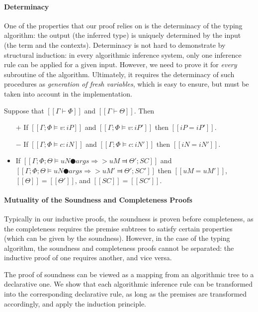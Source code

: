 \paragraph*{Determinacy}
    One of the properties that our proof relies on is the determinacy of the 
    typing algorithm: the output (the inferred type)
    is uniquely determined by the input (the term and the contexts).
    Determinacy is not hard to demonstrate by structural induction: 
    in every algorithmic inference system, only one inference rule can be applied 
    for a given input.  However, we need to prove it for \emph{every} 
    subroutine of the algorithm. Ultimately, it requires 
    the determinacy of such procedures as \emph{generation of fresh variables}, 
    which is easy to ensure, but must be taken into account in the implementation.

\begin{lemma*}
    Suppose that $[[Γ ⊢ Φ]]$ and $[[Γ ⊢ Θ]]$. Then 
    \begin{itemize}
        \item [$+$] If $[[Γ; Φ ⊨ v : iP]]$ and $[[Γ; Φ ⊨ v : iP']]$ then $[[iP = iP']]$.
        \item [$-$] If $[[Γ; Φ ⊨ c : iN]]$ and $[[Γ; Φ ⊨ c : iN']]$ then $[[iN = iN']]$.
        \item If $[[Γ; Φ; Θ ⊨ uN ● args ⇒> uM ⫤ Θ'; SC]]$ and 
            $[[Γ; Φ; Θ ⊨ uN ● args ⇒> uM' ⫤ Θ'; SC']]$ then 
            $[[uM = uM']]$, $[[Θ]] = [[Θ']]$, and $[[SC]] =[[SC']]$.  
    \end{itemize}
\end{lemma*}

\paragraph*{Mutuality of the Soundness and Completeness Proofs}

Typically in our inductive proofs, the soundness is proven before completeness,
as the completeness requires the premise subtrees to satisfy certain properties
(which can be given by the soundness). However, in the case of the typing algorithm,
the soundness and completeness proofs cannot be separated: the inductive proof
of one requires another, and vice versa. 

The proof of soundness can be viewed as a mapping from an algorithmic tree to a
declarative one. We show that each algorithmic inference rule can be transformed
into the corresponding declarative rule, as long as the premises are transformed
accordingly, and apply the induction principle. 

